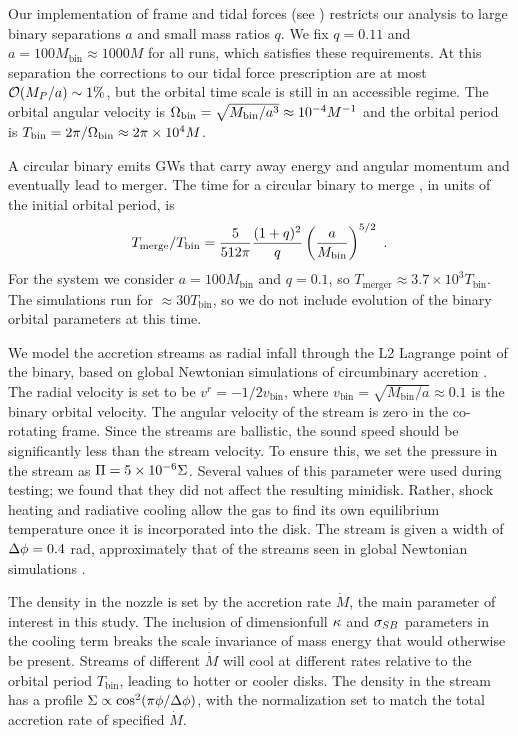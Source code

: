 Our implementation of frame and tidal forces (see ) restricts our analysis to large binary separations $a$ and small mass ratios $q$.  We fix $q=0.11$ and $a = 100 M_\text{bin} \approx 1000 M$ for all runs, which satisfies these requirements.  At this separation the corrections to our tidal force prescription are at most $\mathcal{O}({M_P / a}) \sim 1\%$, but the orbital time scale is still in an accessible regime.  The orbital angular velocity is $\Omega_\text{bin} = \sqrt{M_\text{bin} / a^3} \approx 10^{-4} M^{-1}$ and the orbital period is $T_\text{bin} = 2\pi / \Omega_\text{bin} \approx 2 \pi \times 10^4 M$.

A circular binary emits GWs that carry away energy and angular momentum and eventually lead to merger.  The time for a circular binary to merge \citep{Peters64}, in units of the initial orbital period, is
\begin{equation}
	T_\text{merge} / T_\text{bin} = \frac{5}{512 \pi}\frac{(1+q)^2}{q} \left(\frac{a}{M_\text{bin}}\right)^{5/2} \ . \eqlabel{Tmerge}
\end{equation}
For the system we consider $a=100 M_\text{bin}$ and $q=0.1$, so $T_\text{merger} \approx 3.7\times 10^3 T_\text{bin}$.  The simulations run for $\approx 30 T_\text{bin}$, so we do not include evolution of the binary orbital parameters at this time.

We model the accretion streams as radial infall through the L2 Lagrange point of the binary, based on global Newtonian simulations of circumbinary accretion \citep{Farris14, Farris15A, Farris15B, DOrazio12, DOrazio16}.  The radial velocity is set to be $v^r = -1/2 v_\text{bin}$, where $v_\text{bin} = \sqrt{M_\text{bin}/a} \approx 0.1$ is the binary orbital velocity.  The angular velocity of the stream is zero in the co-rotating frame.  Since the streams are ballistic, the sound speed should be significantly less than the stream velocity.  To ensure this, we set the pressure in the stream as $\Pi = 5 \times 10^{-6} \Sigma$.  Several values of this parameter were used during testing; we found that they did not affect the resulting minidisk. Rather, shock heating and radiative cooling allow the gas to find its own equilibrium temperature once it is incorporated into the disk.  The stream is given a width of $ \Delta \phi = 0.4$ rad, approximately that of the streams seen in global Newtonian simulations \cite{Farris14}.

The density in the nozzle is set by the accretion rate $\dot{M}$, the main parameter of interest in this study.  The inclusion of dimensionfull $\kappa$ and $\sigma_{SB}$ parameters in the cooling term breaks the scale invariance of mass energy that would otherwise be present.  Streams of different $\dot{M}$ will cool at different rates relative to the orbital period $T_{\text{bin}}$, leading to hotter or cooler disks.  The density in the stream has a profile $\Sigma \propto \cos^2(\pi \phi / \Delta \phi)$, with the normalization set to match the total accretion rate of specified $\dot{M}$.

